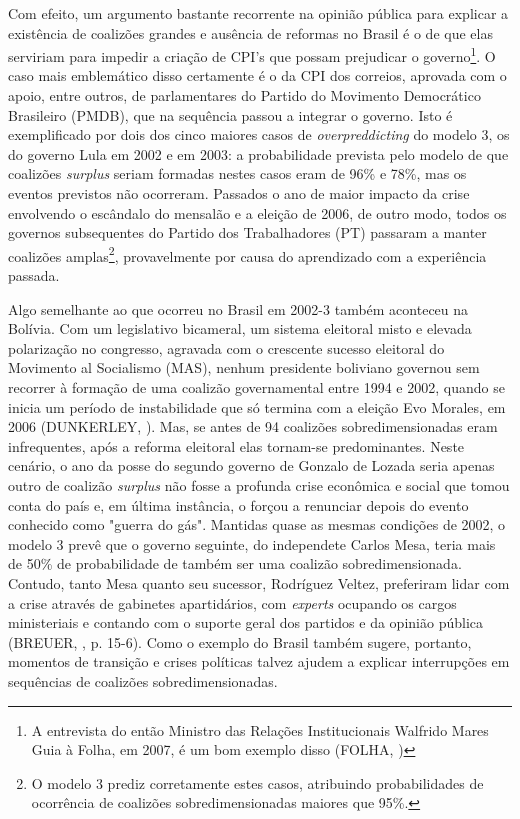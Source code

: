 Com efeito, um argumento bastante recorrente na opinião pública para explicar a existência de coalizões grandes e ausência de reformas no Brasil é o de que elas serviriam para impedir a criação de CPI's que possam prejudicar o governo\footnote{A entrevista do então Ministro das Relações Institucionais Walfrido Mares Guia à Folha, em 2007, é um bom exemplo disso (FOLHA, \citeyear{folha2007})}. O caso mais emblemático disso certamente é o da CPI dos correios, aprovada com o apoio, entre outros, de parlamentares do Partido do Movimento Democrático Brasileiro (PMDB), que na sequência passou a integrar o governo. Isto é exemplificado por dois dos cinco maiores casos de \textit{overpreddicting} do modelo 3, os do governo Lula em 2002 e em 2003: a probabilidade prevista pelo modelo de que coalizões \textit{surplus} seriam formadas nestes casos eram de 96\% e 78\%, mas os eventos previstos não ocorreram. Passados o ano de maior impacto da crise envolvendo o escândalo do mensalão e a eleição de 2006, de outro modo, todos os governos subsequentes do Partido dos Trabalhadores (PT) passaram a manter coalizões amplas\footnote{O modelo 3 prediz corretamente estes casos, atribuindo probabilidades de ocorrência de coalizões sobredimensionadas maiores que 95\%.}, provavelmente por causa do aprendizado com a experiência passada.

Algo semelhante ao que ocorreu no Brasil em 2002-3 também aconteceu na Bolívia. Com um legislativo bicameral, um sistema eleitoral misto e elevada polarização no congresso, agravada com o crescente sucesso eleitoral do Movimento al Socialismo (MAS), nenhum presidente boliviano governou sem recorrer à formação de uma coalizão governamental entre 1994 e 2002, quando se inicia um período de instabilidade que só termina com a eleição Evo Morales, em 2006 (DUNKERLEY, \citeyear{dunkerley2007}). Mas, se antes de 94 coalizões sobredimensionadas eram infrequentes, após a reforma eleitoral elas tornam-se predominantes. Neste cenário, o ano da posse do segundo governo de Gonzalo de Lozada seria apenas outro de coalizão \textit{surplus} não fosse a profunda crise econômica e social que tomou conta do país e, em última instância, o forçou a renunciar depois do evento conhecido como "guerra do gás". Mantidas quase as mesmas condições de 2002, o modelo 3 prevê que o governo seguinte, do independete Carlos Mesa, teria mais de 50\% de probabilidade de também ser uma coalizão sobredimensionada. Contudo, tanto Mesa quanto seu sucessor, Rodríguez Veltez, preferiram lidar com a crise através de gabinetes apartidários, com \textit{experts} ocupando os cargos ministeriais e contando com o suporte geral dos partidos e da opinião pública (BREUER, \citeyear{breuer2008}, p. 15-6). Como o exemplo do Brasil também sugere, portanto, momentos de transição e crises políticas talvez ajudem a explicar interrupções em sequências de coalizões sobredimensionadas.


